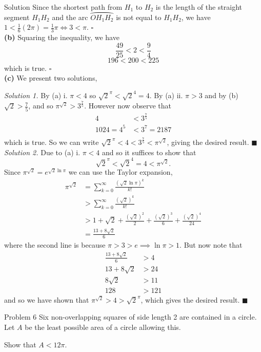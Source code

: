 \documentclass{article}
\begin{document}
\begin{solution}{Solution}
Since the shortest path from $H_1$ to $H_2$ is the length of the
straight segment $H_1 H_2$ and the arc $\wideparen{OH_1H_2}$ is not equal
to $H_1 H_2$, we have $1 < \frac16(2\pi) = \frac13 \pi \iff 3 < \pi$.
$\square$\\

\textbf{(b)} Squaring the inequality, we have
$$
\frac{49}{25} < 2 < \frac{9}{4}
$$
$$
196 < 200 < 225
$$
which is true. $\square$
\\

\textbf{(c)} We present two solutions,

\textit{Solution 1.}
By (a) i. $\pi < 4$ so $\sqrt{2}^\pi < \sqrt{2}^4 = 4$. By (a) ii. $\pi > 3$
and by (b) $\sqrt2 > \frac75$, and so $\pi^{\sqrt2} > 3^{\frac75}$.
However now observe that
\[
\begin{aligned}
4 &< 3^{\frac75}\\
1024 = 4^5 &< 3^7 = 2187\\
\end{aligned}
\]
which is true.
So we can write $\sqrt{2}^{\pi} < 4 < 3^{\frac75} < \pi^{\sqrt2}$, giving
the desired result.
$\blacksquare$\\

\textit{Solution 2.}
Due to (a) i. $\pi < 4$ and so it suffices to show that
$$
\sqrt{2}^{\pi} < \sqrt{2}^4 = 4 < \pi^{\sqrt2}.
$$
Since $\pi^{\sqrt2} = e^{\sqrt2 \ln \pi}$ we can use the Taylor expansion,
\[
\begin{aligned}
\pi^{\sqrt2} &= \sum_{k=0}^{\infty} \frac{(\sqrt2 \ln \pi)^k}{k!}\\
&> \sum_{k=0}^{\infty} \frac{(\sqrt2)^k}{k!}\\
&> 1 + \sqrt2 + \frac{(\sqrt2)^2}{2} + \frac{(\sqrt2)^3}{6} +
\frac{(\sqrt2)^4}{24}\\
&= \frac{13 + 8\sqrt2}{6}
\end{aligned}
\]
where the second line is because $\pi > 3 > e \implies \ln \pi > 1$. But now note that
\[
\begin{aligned}
\frac{13 + 8\sqrt2}{6} &> 4\\
13 + 8\sqrt2 &> 24\\
8\sqrt2 &> 11\\
128 &> 121
\end{aligned}
\]
and so we have shown that $\pi^{\sqrt2} > 4 > \sqrt2^\pi$, which gives
the desired result. $\blacksquare$

\end{solution}
\newpage

\begin{problem}{Problem 6}
Six non-overlapping squares of side length 2 are contained in a circle. Let
$A$ be the least possible area of a circle allowing this. \vspace{0.2cm}

Show that $A < 12\pi$.
\end{problem}
\end{document}
